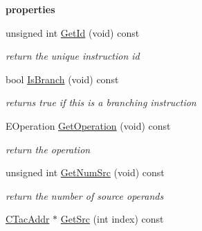 \begin{Indent}{\bf properties}\par
\begin{DoxyCompactItemize}
\item 
\hypertarget{classCTacInstr_a34dfec47d4180195ce2c76d03a7d5a92}{unsigned int \hyperlink{classCTacInstr_a34dfec47d4180195ce2c76d03a7d5a92}{Get\-Id} (void) const }\label{classCTacInstr_a34dfec47d4180195ce2c76d03a7d5a92}

\begin{DoxyCompactList}\small\item\em return the unique instruction id \end{DoxyCompactList}\item 
\hypertarget{classCTacInstr_a325e121e6430e84210117989caecaba9}{bool \hyperlink{classCTacInstr_a325e121e6430e84210117989caecaba9}{Is\-Branch} (void) const }\label{classCTacInstr_a325e121e6430e84210117989caecaba9}

\begin{DoxyCompactList}\small\item\em returns true if this is a branching instruction \end{DoxyCompactList}\item 
\hypertarget{classCTacInstr_acf7604d3e7ded9517cef9c9db6c6a1b4}{E\-Operation \hyperlink{classCTacInstr_acf7604d3e7ded9517cef9c9db6c6a1b4}{Get\-Operation} (void) const }\label{classCTacInstr_acf7604d3e7ded9517cef9c9db6c6a1b4}

\begin{DoxyCompactList}\small\item\em return the operation \end{DoxyCompactList}\item 
\hypertarget{classCTacInstr_a8e4707c8b3a2abdf3e4a92e04e82c5de}{unsigned int \hyperlink{classCTacInstr_a8e4707c8b3a2abdf3e4a92e04e82c5de}{Get\-Num\-Src} (void) const }\label{classCTacInstr_a8e4707c8b3a2abdf3e4a92e04e82c5de}

\begin{DoxyCompactList}\small\item\em return the number of source operands \end{DoxyCompactList}\item 
\hypertarget{classCTacInstr_aa60ff945c027e0f494fff092f495800c}{\hyperlink{classCTacAddr}{C\-Tac\-Addr} $\ast$ \hyperlink{classCTacInstr_aa60ff945c027e0f494fff092f495800c}{Get\-Src} (int index) const }\label{classCTacInstr_aa60ff945c027e0f494fff092f495800c}


\end{DoxyCompactItemize}
\end{Indent}
